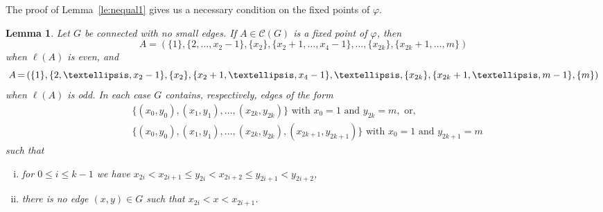 \documentclass[10pt]{amsart}
\newtheorem{lemma}[theorem]{Lemma}
\theoremstyle{definition}
\newcommand*{\Mk}{\mkern -2mu}
\begin{document}
The proof of Lemma~\ref{le:nequal1} gives us a necessary condition on the fixed points of $\varphi$.

\begin{lemma}\label{le:fixshape} Let $G$ be connected with no small edges.
 If $A\in \mathcal{C}(G)$ is a fixed point of $\varphi$, then 
 $$
 A=(\{{1}\},\{2,\ldots,x_2-1\},\{x_2\},\{x_2+1,\ldots,x_4-1\},\ldots,\{x_{2k}\},\{x_{2k}+1,\ldots,m\})
 $$
 when $\ell(A)$ is even, and
 $$
 A\Mk = \Mk (\{1\},\{2,\ldots,x_2-1\},\{x_2\},\{x_2+1,\ldots,x_4-1\},\ldots,\{x_{2k}\},\{x_{2k}+1,\ldots,m-1\},\{m\})
 $$ 
when $\ell(A)$ is odd. In each case $G$ contains, respectively, edges of the form
\begin{align*}
& \big\{(x_0,y_0),(x_1,y_1),\ldots,(x_{2k},y_{2k})\big\}\text{ with }x_0=1 \text{ and }y_{2k} = m,\text{ or},\\
 &\big\{(x_0,y_0),(x_1,y_1),\ldots,(x_{2k},y_{2k}),(x_{2k+1},y_{2k+1})\big\}\text{ with }x_0=1 \text{ and }y_{2k+1} = m
 \end{align*}
 such that 
 \begin{enumerate}[(i)]
 \item %
\label{lemma2.12_i} for $0\le i\le k-1$ we have $x_{2i}<x_{2i+1}\le y_{2i}<x_{2i+2}\le y_{2i+1}<y_{2i+2}$,
 \item %
\label{lemma2.12_ii} there is no edge $(x,y)\in G$ such that $x_{2i}<x<x_{2i+1}$.
 \end{enumerate}
\end{lemma}
\end{document}
